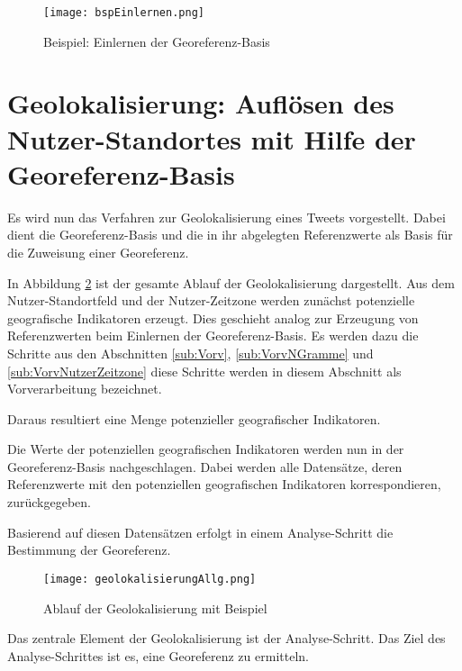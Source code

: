 			\begin{figure}[H]
				\begin{center}
				\texttt{[image: bspEinlernen.png]}
				\caption{Beispiel: Einlernen der Georeferenz-Basis}
				\label{img:bspEinlernen}
				\end{center}
			\end{figure}	
				

	\section{Geolokalisierung: Auflösen des Nutzer-Standortes mit Hilfe der Georeferenz-Basis} \label{sec:AufloesenDesNutzerStandortes} 

		Es wird nun das Verfahren zur Geolokalisierung eines Tweets vorgestellt.
		Dabei dient die Georeferenz-Basis und die in ihr abgelegten Referenzwerte als Basis für die Zuweisung einer Georeferenz.

		In Abbildung \ref{img:ablaufGeolok} ist der gesamte Ablauf der Geolokalisierung dargestellt.
		Aus dem Nutzer-Standortfeld und der Nutzer-Zeitzone werden zunächst potenzielle geografische Indikatoren erzeugt.
		Dies geschieht analog zur Erzeugung von Referenzwerten beim Einlernen der Georeferenz-Basis.
		Es werden dazu die Schritte aus den Abschnitten \ref{sub:Vorv}, \ref{sub:VorvNGramme} und \ref{sub:VorvNutzerZeitzone} diese Schritte werden in diesem Abschnitt als Vorverarbeitung bezeichnet.
		
		Daraus resultiert eine Menge potenzieller geografischer Indikatoren.
		
		Die Werte der potenziellen geografischen Indikatoren werden nun in der Georeferenz-Basis nachgeschlagen. 
		Dabei werden alle Datensätze, deren Referenzwerte mit den potenziellen geografischen Indikatoren korrespondieren, zurückgegeben.
		
		Basierend auf diesen Datensätzen erfolgt in einem Analyse-Schritt die Bestimmung der Georeferenz.

			\begin{figure} 
			\begin{center}
						\texttt{[image: geolokalisierungAllg.png]}
						\caption{Ablauf der Geolokalisierung mit Beispiel}
						\label{img:ablaufGeolok}
					\end{center}
			\end{figure}	

		Das zentrale Element der Geolokalisierung ist der Analyse-Schritt. 
		Das Ziel des Analyse-Schrittes ist es, eine Georeferenz zu ermitteln.
	
